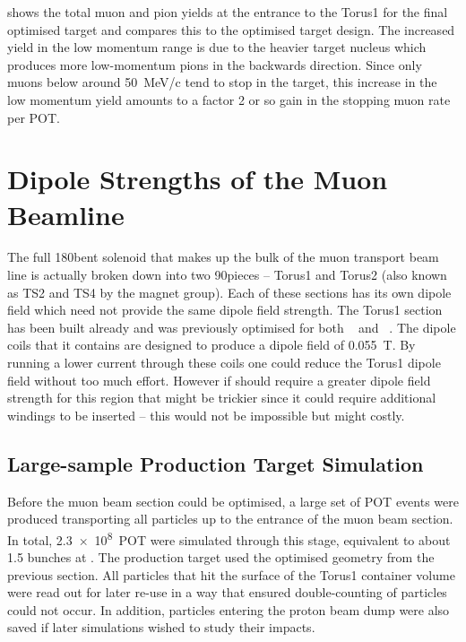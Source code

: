  shows the total muon and pion yields at the entrance to the Torus1 for the final optimised \phaseII target and compares this to the optimised \phaseI target design.
The increased yield in the low momentum range is due to the heavier target nucleus which produces more low-momentum pions in the backwards direction.
Since only muons below around 50~MeV/c tend to stop in the target, this increase in the low momentum yield amounts to a factor 2 or so gain in the stopping muon rate per POT.

\section{Dipole Strengths of the Muon Beamline}

The full 180\degree bent solenoid that makes up the bulk of the muon transport beam line is actually broken down into two
90\degree pieces -- Torus1 and Torus2 (also known as TS2 and TS4 by the magnet group).
Each of these sections has its own dipole field which need not provide the same dipole field strength.
The Torus1 section has been built already and was previously optimised for both \phaseI~\cite{TDR2016} and \phaseII~\cite{CDRphase2}. 
The dipole coils that it contains are designed to produce a dipole field of 0.055~T.
By running a lower current through these coils one could reduce the Torus1 dipole field without too much effort. 
However if \phaseII should require a greater dipole field strength for this region
that might be trickier since it could require additional windings to be inserted -- this would not be impossible but might costly.

\subsection{Large-sample Production Target Simulation}
Before the muon beam section could be optimised, a large set of \ac{POT} events were produced transporting all particles up to the entrance of the muon beam section.
In total, \num{2.3e8}~POT were simulated through this stage, equivalent to about 1.5 bunches at \phaseII.
The production target used the optimised geometry from the previous section.
All particles that hit the surface of the Torus1 container volume were read out for later re-use in a way that ensured double-counting of particles could not occur.
In addition, particles entering the proton beam dump were also saved if later simulations wished to study their impacts.

